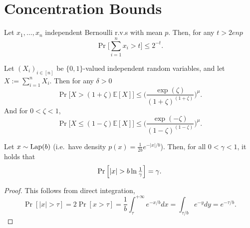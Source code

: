 \section{Concentration Bounds}

\begin{lemma} \label{lem:Mulzer}
Let $x_1,\ldots,x_n$ independent Bernoulli r.v.s with mean $p$. Then, for any $t>2enp$
\[ \Pr\Big[\sum_{i=1}^nx_i > t \Big] \leq 2^{-t}. \]
\end{lemma}

\begin{lemma} \label{lem:multiplicative_Chernoff}
Let $(X_i)_{i\in[n]}$ be $\{0,1\}$-valued independent random variables, and let $X:=\sum_{i=1}^n X_i$. Then for any $\delta>0$
\[ \Pr\big[X>(1+\zeta)\mathbb{E}[X] \big]\leq \Big( \frac{\exp(\zeta)}{(1+\zeta)^{(1+\zeta)}} \Big)^{\mu}. \]
And for $0<\zeta<1$,
\[ \Pr\big[X\leq (1-\zeta)\mathbb{E}[X] \big]\leq \Big( \frac{\exp(-\zeta)}{(1-\zeta)^{(1-\zeta)}} \Big)^{\mu}. \]
\end{lemma}

\begin{proposition} \label{prop:Laplace_concentration}
Let $x\sim \operatorname{Lap}(b)$ (i.e.~have density $p(x)=\frac{1}{2b}e^{-|x|/b}$). Then, for all $0<\gamma<1$, it holds that
\[\textstyle \Pr\sq{|x|>b\ln\frac{1}{\gamma}} = \gamma.\]
\end{proposition}
\begin{proof}
This follows from direct integration,
\[ \Pr[|x|>\tau] = 2 \Pr[x > \tau] = \frac{1}{b} \int_{\tau}^{+\infty} e^{-x/b}dx = \int_{\tau/b} e^{-y} dy = e^{-\tau/b}.\]    
\end{proof}
